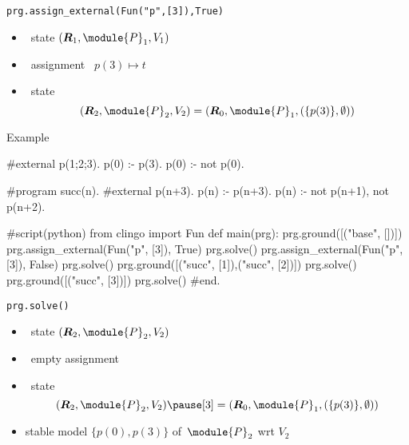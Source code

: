 \begin{frame}{\texttt{prg.assign\_external(Fun("p",[3]),True)}}
  \begin{itemize}
  \item {} \clingo\ state $(\boldsymbol{\RRG}_1,\module{P}_1,V_1 )$
  \item {} \ assignment \ $p(3)\mapsto t$
    \medskip
  \item<2->  \clingo\ state
    \[
    (\boldsymbol{\RRG}_2,\module{P}_2,V_2 )
    =
    (\boldsymbol{\RRG}_0,\module{P}_1,(\{p(3)\},\emptyset))
    \]
  \end{itemize}
\end{frame}
\begin{frame}[fragile]{Example}
\scriptsize\vspace{-10pt}%
\begin{semiverbatim}
   #external p(1;2;3).
   p(0) :- p(3).
   p(0) :- not p(0).

   #program succ(n).
   #external p(n+3).
   p(n) :- p(n+3).
   p(n) :- not p(n+1), not p(n+2).

   #script(python)
   from clingo import Fun
   def main(prg):
       prg.ground([("base", [])])
     \alert<1>{prg.assign_external(Fun("p", [3]), True)}
     \alert<2>{prg.solve()}
       prg.assign_external(Fun("p", [3]), False)
       prg.solve()
       prg.ground([("succ", [1]),("succ", [2])])
       prg.solve()
       prg.ground([("succ", [3])])
       prg.solve()
   #end.
\end{semiverbatim}
\end{frame}
\begin{frame}{\texttt{prg.solve()}}
  \begin{itemize}
  \item {} \clingo\ state $(\boldsymbol{\RRG}_2,\module{P}_2,V_2 )$
  \item {} \ empty assignment
    \medskip
  \item<2->  \clingo\ state
    \[
      (\boldsymbol{\RRG}_2,\module{P}_2,V_2 )\pause[3]
    = (\boldsymbol{\RRG}_0,\module{P}_1,(\{p(3)\},\emptyset))
    \]
  \item<4->  stable model $\{p(0),p(3)\}$ of~$\module{P}_2$ wrt $V_2$
  \end{itemize}
\end{frame}
